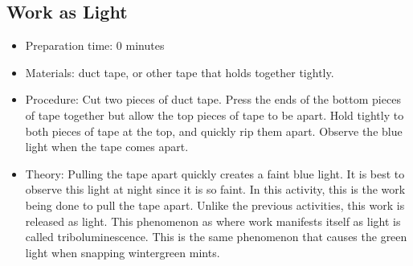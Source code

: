 \subsection{Work as Light}
\begin{itemize}
\item{Preparation time: 0 minutes}
\item{Materials: duct tape, or other tape that holds together tightly.}
\item{Procedure: Cut two pieces of duct tape. Press the ends of the bottom pieces of tape together but allow the top pieces of tape to be apart. Hold tightly to both pieces of tape at the top, and quickly rip them apart. Observe the blue light when the tape comes apart.}
\item{Theory: Pulling the tape apart quickly creates a faint blue light. It is best to observe this light at night since it is so faint. In this activity, this is the work being done to pull the tape apart. Unlike the previous activities, this work is released as light. This phenomenon as where work manifests itself as light is called triboluminescence. This is the same phenomenon that causes the green light when snapping wintergreen mints.}
\end{itemize}
